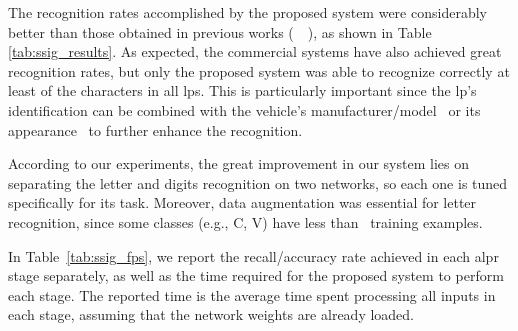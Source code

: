 The recognition rates accomplished by the proposed system were considerably better than those obtained in previous works (~~), as shown in Table \ref{tab:ssig_results}. As expected, the commercial systems have also achieved great recognition rates, but only the proposed system was able to recognize correctly at least  of the  characters in all \glspl*{lp}. 
This is particularly important since the \gls*{lp}'s identification can be combined with the vehicle's manufacturer/model~\cite{dlagnekov2005} or its appearance~\cite{goncalves2016} to further enhance the recognition.

\begin{table}[!htb]
	\centering
	\caption{Recognition rates obtained by the proposed \gls*{alpr} system, previous work and commercial systems in the \gls*{ssig} dataset.}
	\label{tab:ssig_results}
	{
		\renewcommand{\arraystretch}{1.1}
	}
\end{table}

According to our experiments, the great improvement in our system lies on separating the letter and digits recognition on two networks, so each one is tuned specifically for its task. Moreover, data augmentation was essential for letter recognition, since some classes (e.g., C, V) have less than ~training examples.

In Table~\ref{tab:ssig_fps}, we report the recall/accuracy rate achieved in each \gls*{alpr} stage separately, as well as the time required for the proposed system to perform each stage. The reported time is the average time spent processing all inputs in each stage, assuming that the network weights are already loaded.

